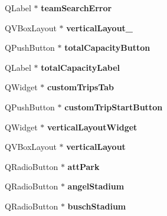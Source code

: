 \begin{DoxyCompactItemize}
\mbox{\label{class_ui___main_window_afbea70c5346da7e84d50310274a0fa23}} 
Q\+Label $\ast$ {\bfseries team\+Search\+Error}
\item 
\mbox{\label{class_ui___main_window_afcc20a3d5058037a00cdc6122f231848}} 
Q\+V\+Box\+Layout $\ast$ {\bfseries vertical\+Layout\+\_}
\item 
\mbox{\label{class_ui___main_window_aa84a860784ccb9d7e58607fd18bf99c0}} 
Q\+Push\+Button $\ast$ {\bfseries total\+Capacity\+Button}
\item 
\mbox{\label{class_ui___main_window_af7dd1aae3a3e130a575ee8cf32c82131}} 
Q\+Label $\ast$ {\bfseries total\+Capacity\+Label}
\item 
\mbox{\label{class_ui___main_window_ab13577a9741c5b6198990d97d05d6fd8}} 
Q\+Widget $\ast$ {\bfseries custom\+Trips\+Tab}
\item 
\mbox{\label{class_ui___main_window_a07c31cf8096c34d42d3d877e0e4ff0ff}} 
Q\+Push\+Button $\ast$ {\bfseries custom\+Trip\+Start\+Button}
\item 
\mbox{\label{class_ui___main_window_a805d415fff07a22a85219e1f22f2da28}} 
Q\+Widget $\ast$ {\bfseries vertical\+Layout\+Widget}
\item 
\mbox{\label{class_ui___main_window_aecd96a04789fcfec3f98d80390ad8184}} 
Q\+V\+Box\+Layout $\ast$ {\bfseries vertical\+Layout}
\item 
\mbox{\label{class_ui___main_window_a44a48c72763a1144fcfd23a5f4d65d57}} 
Q\+Radio\+Button $\ast$ {\bfseries att\+Park}
\item 
\mbox{\label{class_ui___main_window_a4b0c9e845756c49ad33c005c04cef6fa}} 
Q\+Radio\+Button $\ast$ {\bfseries angel\+Stadium}
\item 
\mbox{\label{class_ui___main_window_a123ffe61d568bc4e708e9bc0522b5a9a}} 
Q\+Radio\+Button $\ast$ {\bfseries busch\+Stadium}

\end{DoxyCompactItemize}
